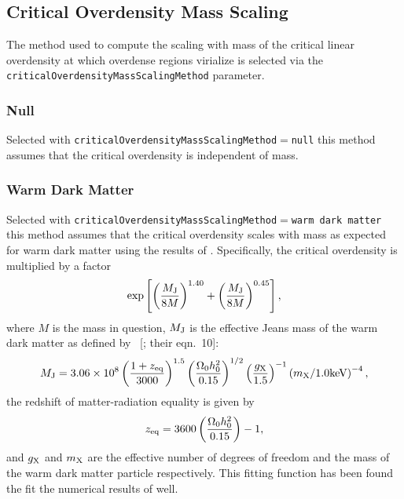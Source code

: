 \subsection{Critical Overdensity Mass Scaling}

The method used to compute the scaling with mass of the critical linear overdensity at which overdense regions virialize is selected via the {\tt criticalOverdensityMassScalingMethod} parameter.

\subsubsection{Null}

Selected with {\tt criticalOverdensityMassScalingMethod}$=${\tt null} this method assumes that the critical overdensity is independent of mass.

\subsubsection{Warm Dark Matter}

Selected with {\tt criticalOverdensityMassScalingMethod}$=${\tt warm dark matter} this method assumes that the critical overdensity scales with mass as expected for warm dark matter using the results of \cite{barkana_constraints_2001}. Specifically, the critical overdensity is multiplied by a factor
\begin{equation}
 \exp\left[ \left({M_{\rm J} \over 8 M}\right)^{1.40}+\left({M_{\rm J} \over 8 M}\right)^{0.45} \right],
\end{equation}
where $M$ is the mass in question, $M_{\rm J}$ is the effective Jeans mass of the warm dark matter as defined by \citeauthor{barkana_constraints_2001}~[\citeyear{barkana_constraints_2001}; their eqn.~10]:
\begin{equation}
M_{\rm J} =  3.06 \times 10^8 \left( {1+z_{\rm eq} \over 3000}\right)^{1.5} \left({\Omega_0 h_0^2 \over 0.15}\right)^{1/2} \left({g_{\rm X} \over 1.5} \right)^{-1} \left({m_{\rm X}/1.0\hbox{keV}}\right)^{-4},
\end{equation}
the redshift of matter-radiation equality is given by
\begin{equation}
z_{\rm eq} = 3600 \left({\Omega_0 h_0^2 \over 0.15}\right)-1,
\end{equation}
and $g_{\rm X}$ and $m_{\rm X}$ are the effective number of degrees of freedom and the mass of the warm dark matter particle respectively. This fitting function has been found the fit the numerical results of \cite{barkana_constraints_2001} well.

